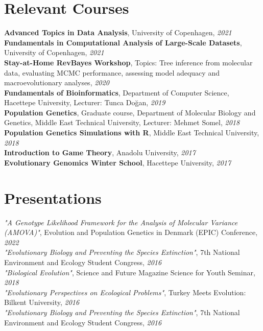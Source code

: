 \documentclass[letterpaper,10.5pt]{article}
\begin{document}
\section{Relevant Courses}
\textbf{Advanced Topics in Data Analysis}, University of Copenhagen, \textit{2021} \\
\textbf{Fundamentals in Computational Analysis of Large-Scale Datasets}, University of Copenhagen, \textit{2021} \\
\textbf{Stay-at-Home RevBayes Workshop}, Topics: Tree inference from molecular data, evaluating MCMC performance, assessing model adequacy and macroevolutionary analyses, \textit{2020} \\
\textbf{Fundamentals of Bioinformatics}, Department of Computer Science, Hacettepe University, Lecturer: Tunca Do\u{g}an,  \textit{2019} \\
\textbf{Population Genetics}, Graduate course, Department of Molecular Biology and Genetics, Middle East Technical University, Lecturer: Mehmet Somel, \textit{2018} \\
\textbf{Population Genetics Simulations with R}, Middle East Technical University, \textit{2018} \\
\textbf{Introduction to Game Theory}, Anadolu University, \textit{2017} \\
\textbf{Evolutionary Genomics Winter School}, Hacettepe University, \textit{2017}  \\

\section{Presentations}
{\textit{"A Genotype Likelihood Framework for the Analysis of Molecular Variance (AMOVA)"}}, Evolution and Population Genetics in Denmark (EPIC) Conference,  \textit{2022} \\
{\textit{"Evolutionary Biology and Preventing the Species Extinction"}}, 7th National Environment and Ecology Student Congress,  \textit{2016} \\
{\textit{"Biological Evolution"}}, Science and Future Magazine Science for Youth Seminar,  \textit{2018} \\
{\textit{"Evolutionary Perspectives on Ecological Problems"}}, Turkey Meets Evolution: Bilkent University,  \textit{2016} \\
{\textit{"Evolutionary Biology and Preventing the Species Extinction"}}, 7th National Environment and Ecology Student Congress,  \textit{2016} \\
\end{document}
